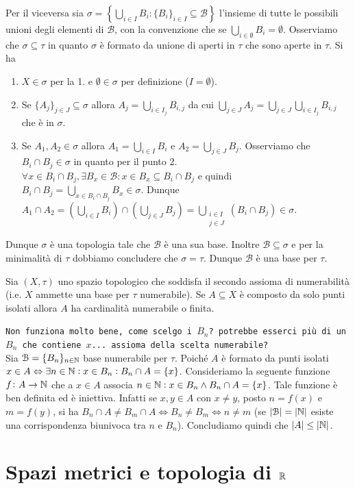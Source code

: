 \documentclass[a4paper]{article}\par \usepackage{style}\par
\begin{document}
Per il viceversa sia $ \sigma = \left\{\bigcup_{i \in I} B_i : \{B_i\}_{i \in I} \subseteq \mathcal{B}\right\} $ l'insieme di tutte le possibili unioni degli elementi di $ \mathcal{B} $, con la convenzione che se $ \bigcup_{i \in \emptyset} B_i = \emptyset $. Osserviamo che $ \sigma \subseteq \tau $ in quanto $ \sigma $ è formato da unione di aperti in $ \tau $ che sono aperte in $ \tau $. Si ha
\begin{enumerate}[label= (\roman*)]
\item $ X \in \sigma $ per la 1. e $ \emptyset \in \sigma $ per definizione ($ I = \emptyset $).
\item Se $ \{A_j\}_{j \in J} \subseteq \sigma $ allora $ A_j = \bigcup_{i \in I_j} B_{i, j} $ da cui $ \bigcup_{j \in J} A_j = \bigcup_{j \in J} \bigcup_{i \in I_j} B_{i, j} $ che è in $ \sigma $.
\item Se $ A_1, A_2 \in \sigma $ allora $ A_1 = \bigcup_{i \in I} B_{i} $ e $ A_2 = \bigcup_{j \in J} B_{j} $. Osserviamo che $ B_{i} \cap B_{j} \in \sigma $ in quanto per il punto 2. $ \forall x \in B_{i} \cap B_{j}, \exists B_x \in \mathcal{B} : x \in B_x \subseteq B_{i} \cap B_{j} $ e quindi $ B_{i} \cap B_{j} = \bigcup_{x \in B_{i} \cap B_{j}} B_x \in \sigma $. Dunque $ A_1 \cap A_2 = (\bigcup_{i \in I} B_{i}) \cap (\bigcup_{j \in J} B_{j}) = \bigcup_{\substack{i \in I \\ j \in J}} (B_{i} \cap B_{j}) \in \sigma $.
\end{enumerate}
Dunque $ \sigma $ è una topologia tale che $ \mathcal{B} $ è una sua base. Inoltre $ \mathcal{B} \subseteq \sigma $ e per la minimalità di $ \tau $ dobbiamo concludere che $ \sigma = \tau $. Dunque $ \mathcal{B} $ è una base per $ \tau $.\par \begin{es}
  Sia $ (X, \tau) $ uno spazio topologico che soddisfa il secondo assioma di numerabilità (i.e. $ X $ ammette una base per $ \tau $ numerabile). Se $ A \subseteq X $ è composto da solo punti isolati allora $ A $ ha cardinalità numerabile o finita.
\end{es}\par \texttt{Non funziona molto bene, come scelgo i $ B_n $? potrebbe esserci più di un $ B_n $ che contiene $ x $... assioma della scelta numerabile?}\\
Sia $ \mathcal{B} = \{B_n\}_{n \in \mathbb{N}} $ base numerabile per $ \tau $. Poiché $ A $ è formato da punti isolati $ x \in A \Leftrightarrow \exists n \in \mathbb{N} : x \in B_n : B_n \cap A = \{x\} $. Consideriamo la seguente funzione $ f \colon A \to \mathbb{N} $ che a $ x \in A $ associa $ n \in \mathbb{N} : x \in B_n \wedge B_n \cap A = \{x\} $. Tale funzione è ben definita ed è iniettiva. Infatti se $ x, y \in A $ con $ x \neq y $, posto $ n = f(x) $ e $ m = f(y) $, si ha $ B_n \cap A \neq B_m \cap A \iff B_n \neq B_m \iff n \neq m $ (se $ \left|\mathcal{B}\right| = \left|\mathbb{N}\right| $ esiste una corrispondenza biunivoca tra $ n $ e $ B_n $). Concludiamo quindi che $ \left|A\right| \leq \left|\mathbb{N}\right| $.\par \section{Spazi metrici e topologia di $ \mathbb{R} $}
\end{document}
